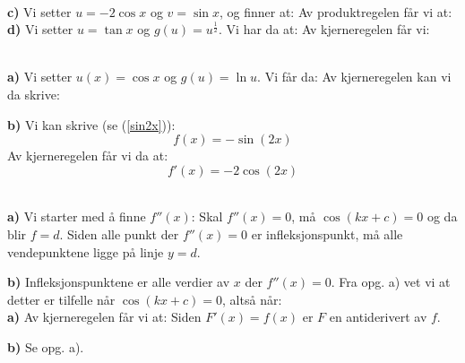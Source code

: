 %


\usepackage{xr}

\setlength{\parskip}{11pt}


\\
\textbf{c)} Vi setter $ {u=-2\cos x} $ og $ v=\sin x $, og finner at:
Av produktregelen får vi at:
\textbf{d)} Vi setter $ u = \tan x $ og $ g(u)=u^\frac{1}{2} $. Vi har da at:
Av kjerneregelen får vi:

 \\
\textbf{a)} Vi setter $ u(x)=\cos x $ og $ g(u)=\ln u $. Vi får da:
Av kjerneregelen kan vi da skrive:

\textbf{b)} Vi kan skrive (se (\ref{sin2x})):
\[ f(x)= -\sin(2x)\]
Av kjerneregelen får vi da at:
\[ f'(x)=-2\cos(2x) \]

 

\\
\textbf{a)} Vi starter med å finne $ f''(x) $:
Skal $ f''(x)=0 $, må $ \cos(kx+c)=0 $ og da blir $ f=d $. Siden alle punkt der $ f''(x)=0 $ er infleksjonspunkt, må alle vendepunktene ligge på linje $ y=d $.

\textbf{b)} Infleksjonspunktene er alle verdier av $ x $ der $ f''(x)=0 $. Fra opg. a) vet vi at detter er tilfelle når $ \cos(kx+c )=0 $, altså når:
 \\
\textbf{a)} Av kjerneregelen får vi at: 
Siden $ F'(x)=f(x) $ er $ F $ en antiderivert av $ f $.

\textbf{b)} Se opg. a).
